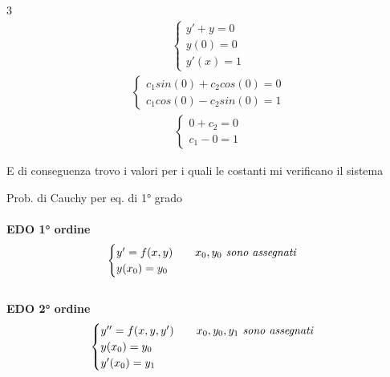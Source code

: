 \documentclass[a4paper, oneside]{article}
\begin{document}
\begin{multicols}{3}
\noindent
\begin{align*}
    \begin{cases}
        y' + y = 0\\
        y(0) = 0\\
        y'(x) = 1
    \end{cases}
\end{align*}
\columnbreak
\begin{align*}
    \begin{cases}
        c_1 sin(0) + c_2 cos(0) = 0\\
        c_1 cos(0) - c_2 sin(0) = 1
    \end{cases}
\end{align*}
\columnbreak
\begin{align*}
    \begin{cases}
        0 + c_2 = 0\\
        c_1 - 0 = 1
    \end{cases}
\end{align*}
\end{multicols}
E di conseguenza trovo i valori per i quali le costanti mi verificano il sistema
\begin{proposition}
Prob. di Cauchy per eq. di 1° grado
\\\\\textbf{EDO 1° ordine}
\begin{align*}
    \begin{cases}
        y' = f(x,y) \qquad x_0,y_0\text{\emph{ sono assegnati}}\\
        y(x_0) = y_0
    \end{cases}
\end{align*}
\\\textbf{EDO 2° ordine}
\begin{align*}
    \begin{cases}
        y'' = f(x,y,y') \qquad x_0,y_0,y_1\text{\emph{ sono assegnati}}\\
        y(x_0) = y_0\\
        y'(x_0) = y_1
    \end{cases}
\end{align*}
    
\end{proposition}
\end{document}
